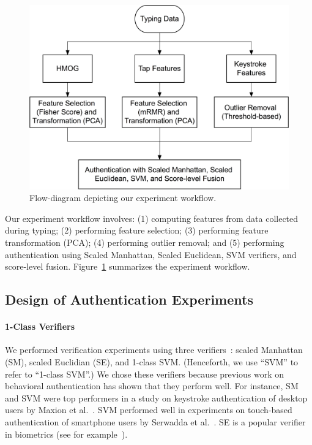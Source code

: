 %

\begin{figure}[htbp]
   \centering
   \includegraphics[width=0.8\linewidth]{FlowChartHMOG.png} %
   \caption{Flow-diagram depicting our experiment workflow.}
   \label{fig:flowchart}
\end{figure}

Our experiment workflow involves: (1) computing features from data collected during typing; (2) performing feature selection; (3) performing feature transformation (PCA); (4) performing  outlier removal; and (5) performing authentication using  Scaled Manhattan, Scaled Euclidean, SVM verifiers, and score-level fusion. 
Figure~\ref{fig:flowchart} summarizes the experiment workflow.


\subsection{Design of Authentication Experiments} \label{authenticationExperiments}

 
\paragraph{1-Class Verifiers} We performed verification experiments using three verifiers~\cite{maxion2009}: scaled Manhattan (SM), scaled Euclidian (SE), and 1-class SVM. (Henceforth, we use ``SVM'' to refer to ``1-class SVM''.) We chose these verifiers because previous work on behavioral authentication has shown that they perform well. For instance, SM and SVM were top performers in a study on keystroke authentication of desktop users by Maxion et al.~\cite{maxion2009}. SVM performed well in experiments on touch-based authentication of smartphone users by Serwadda et al.~\cite{serwadda2013}. SE is a popular verifier in biometrics (see for example~\cite{blanton2011,govindarajan2013}). 
 
